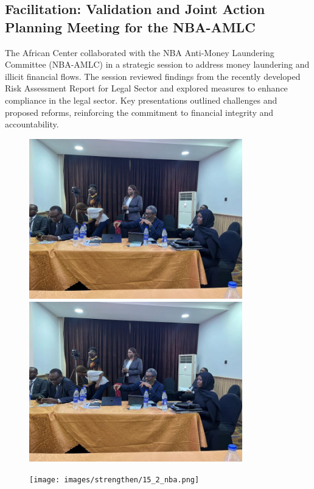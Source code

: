 \documentclass[
  letterpaper,
  DIV=11,
  numbers=noendperiod]{scrreprt}
\begin{document}
\subsection{Facilitation: Validation and Joint Action Planning Meeting
for the
NBA-AMLC}\label{facilitation-validation-and-joint-action-planning-meeting-for-the-nba-amlc}

The African Center collaborated with the NBA Anti-Money Laundering
Committee (NBA-AMLC) in a strategic session to address money laundering
and illicit financial flows. The session reviewed findings from the
recently developed Risk Assessment Report for Legal Sector and explored
measures to enhance compliance in the legal sector. Key presentations
outlined challenges and proposed reforms, reinforcing the commitment to
financial integrity and accountability.

\begin{figure}

\begin{minipage}{0.33\linewidth}
\includegraphics[width=3.64583in,height=\textheight,keepaspectratio]{images/strengthen/15_1_nba.png}\end{minipage}%
%
\begin{minipage}{0.33\linewidth}
\includegraphics[width=3.64583in,height=\textheight,keepaspectratio]{images/strengthen/15_1_nba.png}\end{minipage}%
%
\begin{minipage}{0.33\linewidth}
\texttt{[image: images/strengthen/15\_2\_nba.png]}\end{minipage}%

\end{figure}%
\end{document}

